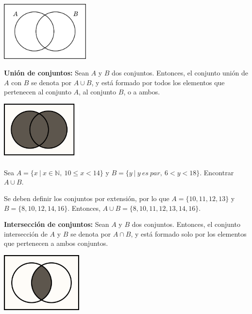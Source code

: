 \documentclass[12pt]{article}
\begin{document}
\begin{center}
    \includegraphics[height=3cm]{Imagenes/IMG1/Venn.png}
\end{center}

\textbf{Unión de conjuntos:} Sean $A$ y $B$ dos conjuntos. Entonces, el conjunto unión de $A$ con $B$ se denota por $A \cup B$, y está formado por todos los elementos que pertenecen al conjunto $A$, al conjunto $B$, o a ambos.

\begin{center}
    \includegraphics[height=3cm]{Imagenes/IMG1/Union.png}
\end{center}

\begin{ejemplo}
    Sea $A=\{x \ | \ x \in \mathbb{N}, \ 10 \leq x < 14\}$ y $B=\{y \ | \ y \ es \ par, \ 6<y<18\}$. Encontrar $A \cup B$.
\end{ejemplo}

\begin{solucion}
    Se deben definir los conjuntos por extensión, por lo que $A=\{10,11,12,13\}$ y $B=\{8,10,12,14,16\}$.  Entonces, $A \cup B=\{8,10,11,12,13,14,16\}$.
\end{solucion}

\textbf{Intersección de conjuntos:} Sean $A$ y $B$ dos conjuntos. Entonces, el conjunto intersección de $A$ y $B$ se denota por $A \cap B$, y está formado solo por los elementos que pertenecen a ambos conjuntos.

\begin{center}
    \includegraphics[height=3cm]{Imagenes/IMG1/Interseccion.png}
\end{center}
\end{document}
